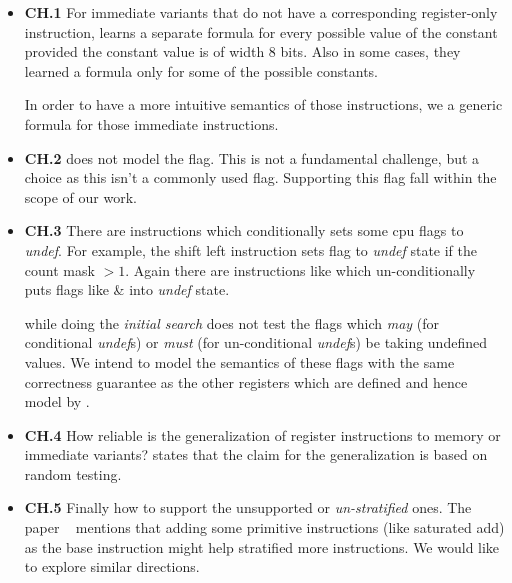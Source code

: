 \begin{itemize}
        
    
    \item  \textbf{CH.1} For immediate  variants that do not have a corresponding register-only instruction, \Strata  learns a separate formula for every possible value of the constant provided the constant value is of width 8 bits. Also in some cases, they learned a formula only for some of the possible constants.
    
    In order to have a more intuitive semantics of those instructions, we a generic formula for those  immediate instructions.

    \item \textbf{CH.2} \Strata does not model the  flag. This is not a fundamental challenge, but a choice as this isn't a commonly used flag. Supporting this flag fall within the scope of our work.
      
    \item \textbf{CH.3} There are instructions which conditionally sets some  cpu flags to \emph{undef}. For example, the shift left instruction  sets flag  to \emph{undef} state if the count mask $>1$. 
    Again there are instructions like  which un-conditionally puts flags like  \&  into \emph{undef} state.
 
    \Strata while doing the \emph{initial search} does not test the flags which \emph{may} (for conditional \emph{undef}s)  or \emph{must} (for un-conditional \emph{undef}s) be taking undefined values. We intend to model the semantics of these flags with the same correctness guarantee as the other registers which are defined and hence model by \Strata.
    
    \item \textbf{CH.4} How reliable is the generalization of register instructions to memory or immediate variants? \Strata states that the claim  for the generalization is based on random testing.
    
    \item \textbf{CH.5} Finally how to support the unsupported or \emph{un-stratified} ones. The paper ~\cite{Heule2016a} mentions that adding some primitive instructions (like saturated add) as the base instruction might help stratified more instructions. We would like to explore similar directions.   

\end{itemize} 

